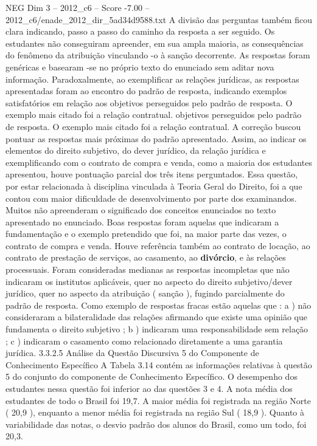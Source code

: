 \begin{textsample}{NEG Dim 3 – 2012\_c6 – Score -7.00 – 2012\_c6/enade\_2012\_dir\_5ad34d9588.txt}
A divisão das perguntas também ficou clara indicando, passo a passo do caminho da resposta a ser seguido.
Os estudantes não conseguiram apreender, em sua ampla maioria, as consequências do fenômeno da atribuição vinculando -o à sanção decorrente.
As respostas foram genéricas e basearam -se no próprio texto do enunciado sem aditar nova informação.
Paradoxalmente, ao exemplificar as relações jurídicas, as respostas apresentadas foram ao encontro do padrão de resposta, indicando exemplos satisfatórios em relação aos objetivos perseguidos pelo padrão de resposta.
O exemplo mais citado foi a relação contratual. objetivos perseguidos pelo padrão de resposta.
O exemplo mais citado foi a relação contratual.
A correção buscou pontuar as respostas mais próximas do padrão apresentado.
Assim, ao indicar os elementos do direito subjetivo, do dever jurídico, da relação jurídica e exemplificando com o contrato de compra e venda, como a maioria dos estudantes apresentou, houve pontuação parcial dos três itens perguntados.
Essa questão, por estar relacionada à disciplina vinculada à Teoria Geral do Direito, foi a que contou com maior dificuldade de desenvolvimento por parte dos examinandos.
Muitos não apreenderam o significado dos conceitos enunciados no texto apresentado no enunciado.
Boas respostas foram aquelas que indicaram a fundamentação e o exemplo pretendido que foi, na maior parte das vezes, o contrato de compra e venda.
Houve referência também ao contrato de locação, ao contrato de prestação de serviços, ao casamento, ao \textbf{divórcio}, e às relações processuais.
Foram consideradas medianas as respostas incompletas que não indicaram os institutos aplicáveis, quer no aspecto do direito subjetivo/dever jurídico, quer no aspecto da atribuição ( sanção ), fugindo parcialmente do padrão de resposta.
Como exemplo de respostas fracas estão aquelas que : a ) não consideraram a bilateralidade das relações afirmando que existe uma opinião que fundamenta o direito subjetivo ; b ) indicaram uma responsabilidade sem relação ; c ) indicaram o casamento como relacionado diretamente a uma garantia jurídica. 3.3.2.5 Análise da Questão Discursiva 5 do Componente de Conhecimento Específico A Tabela 3.14 contém as informações relativas à questão 5 do conjunto do componente de Conhecimento Específico.
O desempenho dos estudantes nessa questão foi inferior ao das questões 3 e 4.
A nota média dos estudantes de todo o Brasil foi 19,7.
A maior média foi registrada na região Norte ( 20,9 ), enquanto a menor média foi registrada na região Sul ( 18,9 ).
Quanto à variabilidade das notas, o desvio padrão dos alunos do Brasil, como um todo, foi 20,3.

\end{textsample}
